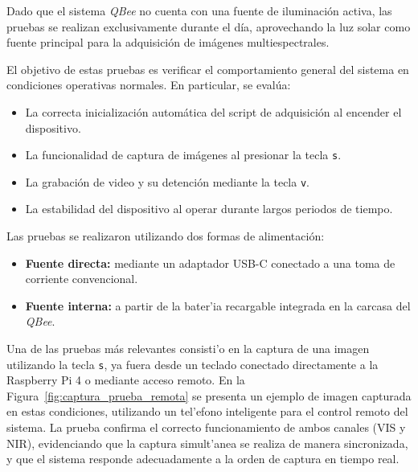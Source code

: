         \noindent Dado que el sistema \textit{QBee} no cuenta con una fuente de iluminación activa, las pruebas se realizan exclusivamente durante el día, aprovechando la luz solar como fuente principal para la adquisición de imágenes multiespectrales.
        
        \noindent El objetivo de estas pruebas es verificar el comportamiento general del sistema en condiciones operativas normales. En particular, se evalúa:
        
        \begin{itemize}
        \item La correcta inicialización automática del script de adquisición al encender el dispositivo.
        \item La funcionalidad de captura de imágenes al presionar la tecla \texttt{s}.
        \item La grabación de video y su detención mediante la tecla \texttt{v}.
        \item La estabilidad del dispositivo al operar durante largos periodos de tiempo.
        \end{itemize}
        
        \noindent Las pruebas se realizaron utilizando dos formas de alimentación:
        \begin{itemize}
        \item \textbf{Fuente directa:} mediante un adaptador USB-C conectado a una toma de corriente convencional.
        \item \textbf{Fuente interna:} a partir de la bater'ia recargable integrada en la carcasa del \textit{QBee}.
        \end{itemize}
        
        \noindent Una de las pruebas más relevantes consisti'o en la captura de una imagen utilizando la tecla \texttt{s}, ya fuera desde un teclado conectado directamente a la Raspberry Pi 4 o mediante acceso remoto. En la Figura~\ref{fig:captura_prueba_remota} se presenta un ejemplo de imagen capturada en estas condiciones, utilizando un tel'efono inteligente para el control remoto del sistema. La prueba confirma el correcto funcionamiento de ambos canales (VIS y NIR), evidenciando que la captura simult'anea se realiza de manera sincronizada, y que el sistema responde adecuadamente a la orden de captura en tiempo real.
        
